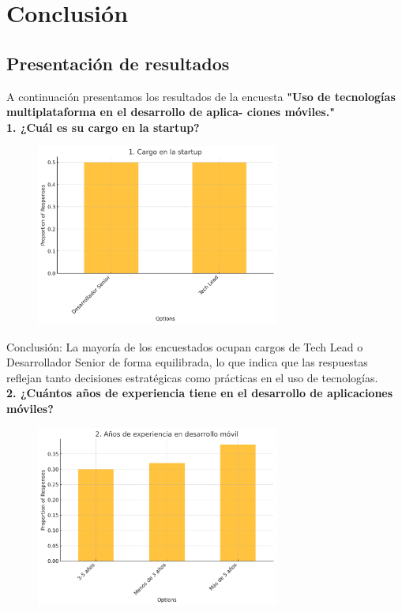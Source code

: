 \newpage
\section{Conclusión}
\subsection{Presentación de resultados}

A continuación presentamos los resultados de la encuesta \textbf{"Uso de tecnologías multiplataforma en el desarrollo de aplica-
ciones móviles."}\\

\textbf{1. ¿Cuál es su cargo en la startup?}

\begin{figure}[h!]
    \includegraphics[width=8cm]{images/question1.png}
    \centering
\end{figure}

Conclusión: La mayoría de los encuestados ocupan cargos de Tech Lead o Desarrollador Senior de forma equilibrada, lo que indica que las respuestas reflejan tanto decisiones estratégicas como prácticas en el uso de tecnologías.\\

\textbf{2. ¿Cuántos años de experiencia tiene en el desarrollo de aplicaciones móviles?}

\begin{figure}[h!]
    \includegraphics[width=8cm]{images/question2.png}
    \centering
\end{figure}

